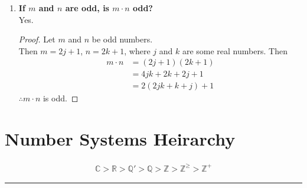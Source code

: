 \documentclass[../notes.tex]{subfiles}
\begin{document}
\begin{enumerate}
\begin{proof}
\begin{align*}
						m + n &= 2j + 2k\\
						&= 2(j + k)
					\end{align*}
					As the sum of the two numbers is a multiple of $2$, $m + n$ is even.
				\end{proof}
				\item \textbf{If $m$ and $n$ are odd, is $m \cdot n$ odd?}\\
				Yes.
				\begin{proof}
					Let $m$ and $n$ be odd numbers.\\
					Then $m = 2j + 1$, $n = 2k + 1$, where $j$ and $k$ are some real numbers.
					Then
					\begin{align*}
						m\cdot n &= (2j + 1)(2k + 1)\\
						&= 4jk + 2k + 2j + 1\\
						&= 2(2jk + k + j) + 1
					\end{align*}
					$\therefore m \cdot n$ is odd. 
				\end{proof}
			\end{enumerate}
		\section{Number Systems Heirarchy}
			\begin{align*}
				\mathbb{C} > \mathbb{R} > \mathbb{Q}' > \mathbb{Q} > \mathbb{Z} > \mathbb{Z}^{\geq} > \mathbb{Z}^{+}
			\end{align*}
	\noindent\rule{\textwidth}{0.4pt}
\end{document}

